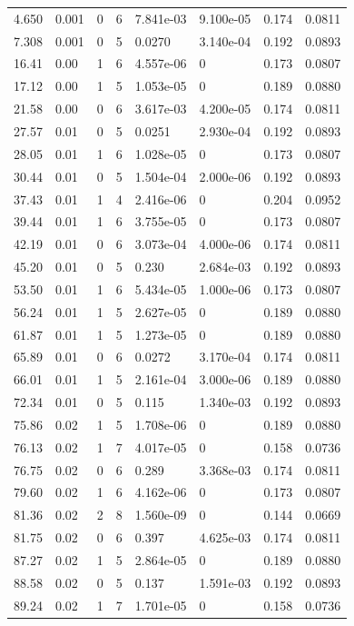 \documentclass[preview]{standalone}
\begin{document}
{{\begin{tabular}{L{1.2cm}C{1.2cm} C{0.3cm}C{0.5cm} C{1.4cm}C{1.4cm} C{1.4cm}C{1.4cm}}
  4.650  &  0.001  & 0     &  6 &  7.841e-03  & 9.100e-05  & 0.174 &  0.0811   \\ 
  7.308  &  0.001  & 0     &  5 &  0.0270  & 3.140e-04  & 0.192 &  0.0893   \\ 
  16.41  &  0.00  & 1     &  6 &  4.557e-06  & 0  & 0.173 &  0.0807   \\ 
  17.12  &  0.00  & 1     &  5 &  1.053e-05  & 0  & 0.189 &  0.0880   \\ 
  21.58  &  0.00  & 0     &  6 &  3.617e-03  & 4.200e-05  & 0.174 &  0.0811   \\ 
  27.57  &  0.01  & 0     &  5 &  0.0251  & 2.930e-04  & 0.192 &  0.0893   \\ 
  28.05  &  0.01  & 1     &  6 &  1.028e-05  & 0  & 0.173 &  0.0807   \\ 
  30.44  &  0.01  & 0     &  5 &  1.504e-04  & 2.000e-06  & 0.192 &  0.0893   \\ 
  37.43  &  0.01  & 1     &  4 &  2.416e-06  & 0  & 0.204 &  0.0952   \\ 
  39.44  &  0.01  & 1     &  6 &  3.755e-05  & 0  & 0.173 &  0.0807   \\ 
  42.19  &  0.01  & 0     &  6 &  3.073e-04  & 4.000e-06  & 0.174 &  0.0811   \\ 
  45.20  &  0.01  & 0     &  5 &  0.230  & 2.684e-03  & 0.192 &  0.0893   \\ 
  53.50  &  0.01  & 1     &  6 &  5.434e-05  & 1.000e-06  & 0.173 &  0.0807   \\ 
  56.24  &  0.01  & 1     &  5 &  2.627e-05  & 0  & 0.189 &  0.0880   \\ 
  61.87  &  0.01  & 1     &  5 &  1.273e-05  & 0  & 0.189 &  0.0880   \\ 
  65.89  &  0.01  & 0     &  6 &  0.0272  & 3.170e-04  & 0.174 &  0.0811   \\ 
  66.01  &  0.01  & 1     &  5 &  2.161e-04  & 3.000e-06  & 0.189 &  0.0880   \\ 
  72.34  &  0.01  & 0     &  5 &  0.115  & 1.340e-03  & 0.192 &  0.0893   \\ 
  75.86  &  0.02  & 1     &  5 &  1.708e-06  & 0  & 0.189 &  0.0880   \\ 
  76.13  &  0.02  & 1     &  7 &  4.017e-05  & 0  & 0.158 &  0.0736   \\ 
  76.75  &  0.02  & 0     &  6 &  0.289  & 3.368e-03  & 0.174 &  0.0811   \\ 
  79.60  &  0.02  & 1     &  6 &  4.162e-06  & 0  & 0.173 &  0.0807   \\ 
  81.36  &  0.02  & 2     &  8 &  1.560e-09  & 0  & 0.144 &  0.0669   \\ 
  81.75  &  0.02  & 0     &  6 &  0.397  & 4.625e-03  & 0.174 &  0.0811   \\ 
  87.27  &  0.02  & 1     &  5 &  2.864e-05  & 0  & 0.189 &  0.0880   \\ 
  88.58  &  0.02  & 0     &  5 &  0.137  & 1.591e-03  & 0.192 &  0.0893   \\ 
  89.24  &  0.02  & 1     &  7 &  1.701e-05  & 0  & 0.158 &  0.0736   \\ 
\hline 
\end{tabular} 

}}
\end{document}
